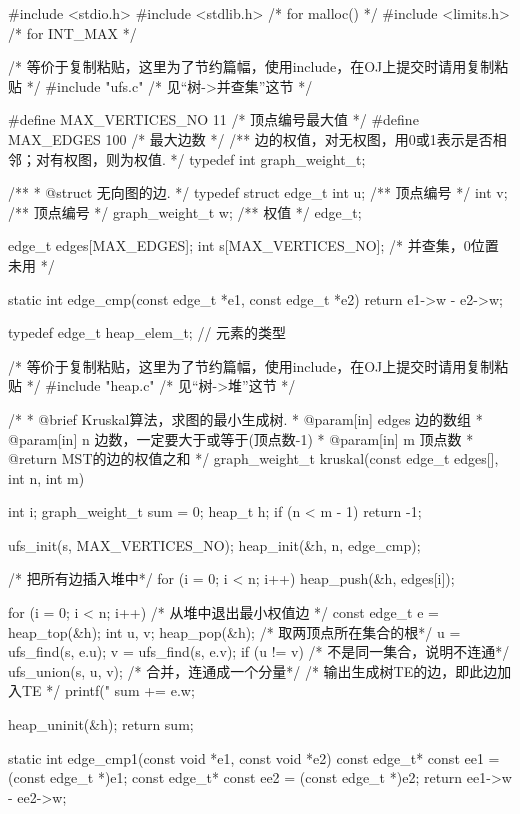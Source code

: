 \begin{Codex}[label=kruskal.c]
#include <stdio.h>
#include <stdlib.h>  /* for malloc() */
#include <limits.h>  /* for INT_MAX */

/* 等价于复制粘贴，这里为了节约篇幅，使用include，在OJ上提交时请用复制粘贴 */
#include "ufs.c"  /* 见“树->并查集”这节 */

#define MAX_VERTICES_NO 11 /* 顶点编号最大值 */
#define MAX_EDGES 100  /* 最大边数 */
/** 边的权值，对无权图，用0或1表示是否相邻；对有权图，则为权值. */
typedef int graph_weight_t;

/**
 * @struct 无向图的边.
 */
typedef struct edge_t{
    int u;  /** 顶点编号 */
    int v;  /** 顶点编号 */
    graph_weight_t w;  /** 权值 */
} edge_t;

edge_t edges[MAX_EDGES];
int s[MAX_VERTICES_NO]; /* 并查集，0位置未用  */

static int edge_cmp(const edge_t *e1, const edge_t *e2) {
    return e1->w - e2->w;
}

typedef edge_t heap_elem_t; // 元素的类型

/* 等价于复制粘贴，这里为了节约篇幅，使用include，在OJ上提交时请用复制粘贴 */
#include "heap.c"  /* 见“树->堆”这节 */


/*
  * @brief Kruskal算法，求图的最小生成树.
  * @param[in] edges 边的数组
  * @param[in] n 边数，一定要大于或等于(顶点数-1)
  * @param[in] m 顶点数
  * @return MST的边的权值之和
  */
graph_weight_t kruskal(const edge_t edges[], int n, int m) {
    int i;
    graph_weight_t sum = 0;
    heap_t h;
    if (n < m - 1) return -1;

    ufs_init(s, MAX_VERTICES_NO);
    heap_init(&h, n, edge_cmp);

    /* 把所有边插入堆中*/
    for (i = 0; i < n; i++) {
        heap_push(&h, edges[i]);
    }

    for (i = 0; i < n; i++) {
        /* 从堆中退出最小权值边 */
        const edge_t e = heap_top(&h);
        int u, v;
        heap_pop(&h);
        /* 取两顶点所在集合的根*/
        u = ufs_find(s, e.u);
        v = ufs_find(s, e.v);
        if (u != v) { /* 不是同一集合，说明不连通*/
            ufs_union(s, u, v); /* 合并，连通成一个分量*/
            /* 输出生成树TE的边，即此边加入TE */
            printf("%
            sum += e.w;
        }
    }

    heap_uninit(&h);
    return sum;
}

static int edge_cmp1(const void *e1, const void *e2) {
    const edge_t* const ee1 = (const edge_t *)e1;
    const edge_t* const ee2 = (const edge_t *)e2;
    return ee1->w - ee2->w;
}


\end{Codex}

